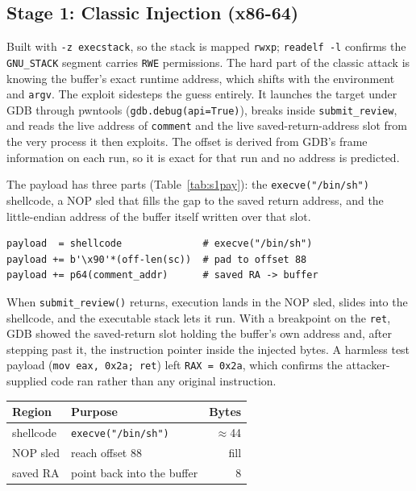 \documentclass[10pt,twocolumn,letterpaper]{article}
\newcommand{\code}[1]{\texttt{\small #1}}
\begin{document}
\subsection{Stage 1: Classic Injection (x86-64)}
Built with \code{-z execstack}, so the stack is mapped \code{rwxp};
\code{readelf -l} confirms the \code{GNU\_STACK} segment carries \code{RWE}
permissions. The hard part of the classic attack is knowing the buffer's exact
runtime address, which shifts with the environment and \code{argv}. The exploit
sidesteps the guess entirely. It launches the target under GDB through
pwntools (\code{gdb.debug(api=True)}), breaks inside \code{submit\_review}, and
reads the live address of \code{comment} and the live saved-return-address slot
from the very process it then exploits. The offset is derived from GDB's frame
information on each run, so it is exact for that run and no address is predicted.

The payload has three parts (Table~\ref{tab:s1pay}): the \code{execve("/bin/sh")}
shellcode, a NOP sled that fills the gap to the saved return address, and the
little-endian address of the buffer itself written over that slot.
\begin{lstlisting}[style=py]
payload  = shellcode              # execve("/bin/sh")
payload += b'\x90'*(off-len(sc))  # pad to offset 88
payload += p64(comment_addr)      # saved RA -> buffer
\end{lstlisting}
\noindent When \code{submit\_review()} returns, execution lands in the NOP sled,
slides into the shellcode, and the executable stack lets it run. With a
breakpoint on the \code{ret}, GDB showed the saved-return slot holding the
buffer's own address and, after stepping past it, the instruction pointer inside
the injected bytes. A harmless test payload (\code{mov eax, 0x2a; ret}) left
\code{RAX = 0x2a}, which confirms the attacker-supplied code ran rather than any
original instruction.

\begin{center}\footnotesize
\begin{tabular}{@{}llr@{}}
\toprule
\textbf{Region} & \textbf{Purpose} & \textbf{Bytes}\\
\midrule
shellcode & \code{execve("/bin/sh")} & $\approx$44\\
NOP sled  & reach offset 88 & fill\\
saved RA  & point back into the buffer & 8\\
\bottomrule
\end{tabular}
\label{tab:s1pay}
\end{center}
\end{document}
